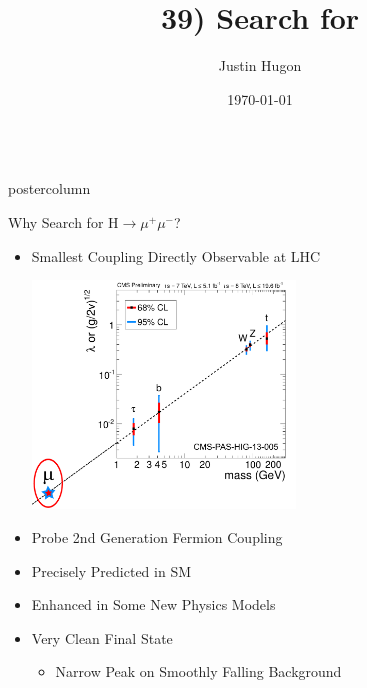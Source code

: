 \documentclass[final,hyperref={pdfpagelabels=false}]{beamer}
\title{39) Search for \hmm}
\author{Justin Hugon}
\institute{On Behalf of the CMS Collaboration}
\date{\today}
\newcommand{\hmm}{\ensuremath{\mathrm{H} \rightarrow \mu^+\mu^-}}
\newlength{\columnheight}
\begin{document}
\begin{frame}
  \begin{columns}
    \begin{column}{.49\textwidth}
      \begin{beamercolorbox}[center,wd=\textwidth]{postercolumn}
        \begin{minipage}[T]{.95\textwidth}  %
          \parbox[t][\columnheight]{\textwidth}{ %
            \begin{block}{\boldmath Why Search for \hmm{}?}
              \begin{itemize}
                \item Smallest Coupling Directly Observable at LHC
                \begin{center}
                  \includegraphics[width=0.55\textwidth]{other/myCouplingVMass3.pdf}
                \end{center}              
                \item Probe 2nd Generation Fermion Coupling
                \item Precisely Predicted in SM
                \item Enhanced in Some New Physics Models
                \item Very Clean Final State
                \begin{itemize}
                  \item Narrow Peak on Smoothly Falling Background
                \end{itemize}              

\end{itemize}
\end{block}}
\end{minipage}
\end{beamercolorbox}
\end{column}
\end{columns}
\end{frame}
\end{document}
